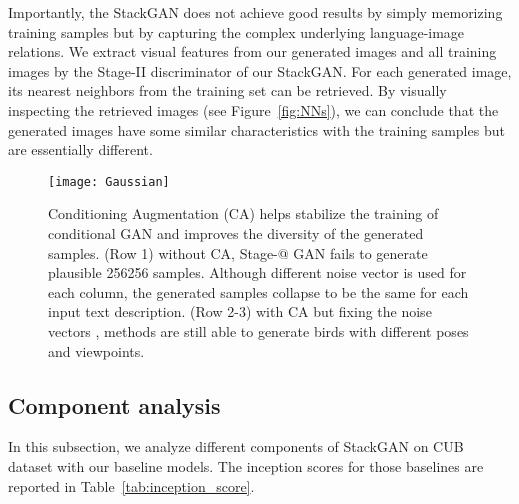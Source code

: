 \documentclass[10pt,twocolumn,letterpaper]{article}
\makeatletter
\newcommand{\Rmnum}[1]{\expandafter\@slowromancap\romannumeral #1@}
\makeatother
\begin{document}
Importantly, the StackGAN does not achieve good results by simply memorizing training samples but by capturing the complex underlying language-image relations. We extract visual features from our generated images and all training images by the Stage-II discriminator  of our StackGAN. For each generated image, its nearest neighbors from the training set can be retrieved. By visually inspecting the retrieved images (see Figure~\ref{fig:NNs}), we can conclude that the generated images have some similar characteristics with the training samples but are essentially different. 


\begin{figure}[bt]
\begin{center}
	\texttt{[image: Gaussian]}
\end{center}
\vspace{-8pt}
   \caption{Conditioning Augmentation (CA) helps stabilize the training of conditional GAN and improves the diversity of the generated samples. 
   (Row 1) without CA, Stage-\Rmnum{1} GAN fails to generate plausible 256256 samples. Although different noise vector  is used for each column, the generated samples collapse to be the same for each input text description. 
   (Row 2-3) with CA but fixing the noise vectors , methods are still able to generate birds with different poses and viewpoints.}
\vspace{-3pt}
\label{fig:Gaussian}
\end{figure}


\vspace{-2pt}
\subsection{Component analysis}
\vspace{-5pt}

In this subsection, we analyze different components of StackGAN on CUB dataset with our baseline models. 
The inception scores for those baselines are reported in Table~\ref{tab:inception_score}.
\end{document}
